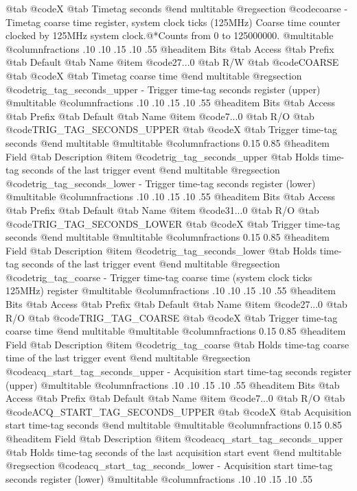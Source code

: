 @tab @code{X} @tab 
Timetag seconds
@end multitable
@regsection @code{coarse} - Timetag coarse time register, system clock ticks (125MHz)
Coarse time counter clocked by 125MHz system clock.@*Counts from 0 to 125000000.
@multitable @columnfractions .10 .10 .15 .10 .55
@headitem Bits @tab Access @tab Prefix @tab Default @tab Name
@item @code{27...0}
@tab R/W @tab
@code{COARSE}
@tab @code{X} @tab 
Timetag coarse time
@end multitable
@regsection @code{trig_tag_seconds_upper} - Trigger time-tag seconds register (upper)
@multitable @columnfractions .10 .10 .15 .10 .55
@headitem Bits @tab Access @tab Prefix @tab Default @tab Name
@item @code{7...0}
@tab R/O @tab
@code{TRIG_TAG_SECONDS_UPPER}
@tab @code{X} @tab 
Trigger time-tag seconds
@end multitable
@multitable @columnfractions 0.15 0.85
@headitem Field @tab Description
@item @code{trig_tag_seconds_upper} @tab Holds time-tag seconds of the last trigger event
@end multitable
@regsection @code{trig_tag_seconds_lower} - Trigger time-tag seconds register (lower)
@multitable @columnfractions .10 .10 .15 .10 .55
@headitem Bits @tab Access @tab Prefix @tab Default @tab Name
@item @code{31...0}
@tab R/O @tab
@code{TRIG_TAG_SECONDS_LOWER}
@tab @code{X} @tab 
Trigger time-tag seconds
@end multitable
@multitable @columnfractions 0.15 0.85
@headitem Field @tab Description
@item @code{trig_tag_seconds_lower} @tab Holds time-tag seconds of the last trigger event
@end multitable
@regsection @code{trig_tag_coarse} - Trigger time-tag coarse time (system clock ticks 125MHz) register
@multitable @columnfractions .10 .10 .15 .10 .55
@headitem Bits @tab Access @tab Prefix @tab Default @tab Name
@item @code{27...0}
@tab R/O @tab
@code{TRIG_TAG_COARSE}
@tab @code{X} @tab 
Trigger time-tag coarse time
@end multitable
@multitable @columnfractions 0.15 0.85
@headitem Field @tab Description
@item @code{trig_tag_coarse} @tab Holds time-tag coarse time of the last trigger event
@end multitable
@regsection @code{acq_start_tag_seconds_upper} - Acquisition start time-tag seconds register (upper)
@multitable @columnfractions .10 .10 .15 .10 .55
@headitem Bits @tab Access @tab Prefix @tab Default @tab Name
@item @code{7...0}
@tab R/O @tab
@code{ACQ_START_TAG_SECONDS_UPPER}
@tab @code{X} @tab 
Acquisition start time-tag seconds
@end multitable
@multitable @columnfractions 0.15 0.85
@headitem Field @tab Description
@item @code{acq_start_tag_seconds_upper} @tab Holds time-tag seconds of the last acquisition start event
@end multitable
@regsection @code{acq_start_tag_seconds_lower} - Acquisition start time-tag seconds register (lower)
@multitable @columnfractions .10 .10 .15 .10 .55

